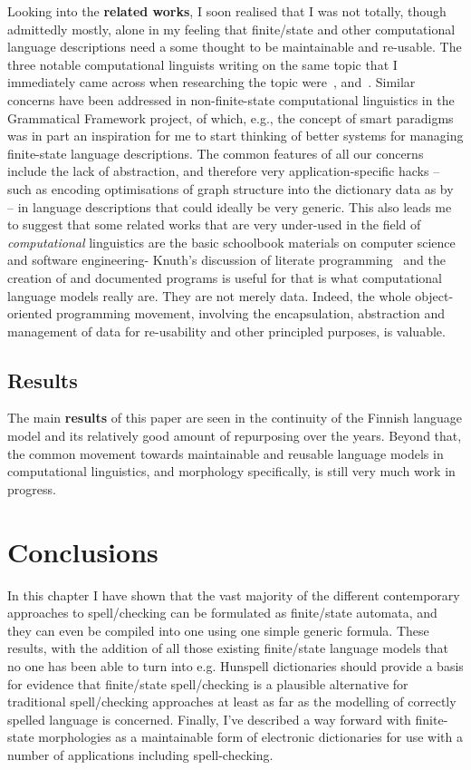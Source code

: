 \documentclass[officiallayout,final]{unihelcompling}
\begin{document}
Looking into the \textbf{related works}, I soon realised that I was not
totally, though admittedly mostly, alone in my feeling that finite\-/state and
other computational language descriptions need a some thought to be
maintainable and re-usable. The three notable computational linguists writing
on the same topic that I immediately came across when researching the topic
were~\citet{maxwell2008joint}, and~\citet{wintner2008strengths}. Similar
concerns have been addressed in non-finite-state computational linguistics in
the Grammatical Framework project, of which, e.g., the concept of smart
paradigms~\citep{ranta2008predictable} was in part an inspiration for me to
start thinking of better systems for managing finite-state language
descriptions.  The common features of all our concerns include the lack of
abstraction, and therefore very application-specific hacks -- such as encoding
optimisations of graph structure into the dictionary data as
by~\citet{karttunen2006numbers} -- in language descriptions that could ideally
be very generic. This also leads me to suggest that some related works that are
very under-used in the field of \emph{computational} linguistics are the basic
schoolbook materials on computer science and software engineering- Knuth's
discussion of literate programming~\citep{knuth1984literate} and the creation
of and documented programs is useful for that is what computational language
models really are. They are not merely data. Indeed, the whole object-oriented
programming movement, involving the encapsulation, abstraction and management
of data for re-usability and other principled purposes, is valuable.

\subsection{Results}

The main \textbf{results} of this paper are seen in the continuity of the
Finnish language model and its relatively good amount of repurposing over the
years.  Beyond that, the common movement towards maintainable and reusable
language models in computational linguistics, and morphology specifically, is
still very much work in progress.

\section{Conclusions}

In this chapter I have shown that the vast majority of the different
contemporary approaches to spell\-/checking can be formulated as finite\-/state
automata, and they can even be compiled into one using one simple generic
formula. These results, with the addition of all those existing finite\-/state
language models that no one has been able to turn into e.g. Hunspell
dictionaries should provide a basis for evidence that finite\-/state
spell\-/checking is a plausible alternative for traditional spell\-/checking
approaches at least as far as the modelling of correctly spelled language is
concerned. Finally, I've described a way forward with finite-state morphologies
as a maintainable form of electronic dictionaries for use with a number of
applications including spell-checking.
\end{document}
